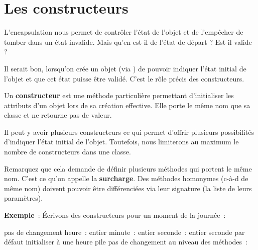 \section{Les constructeurs}

	L'encapsulation nous permet de contrôler
	l'état de l'objet et de
	l'empêcher de tomber dans un état invalide. Mais
	qu'en est-il de l'état de départ ?
	Est-il valide ?
	
	Il serait bon, lorsqu'on crée un objet (via
	) de pouvoir indiquer l'état
	initial de l'objet et que cet état puisse être validé.
	C'est le rôle précis des constructeurs.
	
	Un \textbf{constructeur} est une méthode particulière permettant
	d'initialiser les attributs d'un
	objet lors de sa création effective. Elle porte le même nom que sa
	classe et ne retourne pas de valeur.
	
	Il peut y avoir plusieurs constructeurs ce qui permet
	d'offrir plusieurs possibilités d'indiquer l'état initial de
	l'objet. Toutefois, nous limiterons au maximum le nombre 
	de constructeurs dans une classe.
	
	Remarquez que cela demande de définir plusieurs méthodes 
	qui portent le même nom. C'est ce qu'on appelle la
	\textbf{surcharge}. Des méthodes homonymes (c-à-d de même nom) doivent
	pouvoir être différenciées via leur signature (la liste de leurs
	paramètres).

	\textbf{Exemple}~:
	Écrivons des constructeurs pour un moment de la journée~:

	\begin{Pseudocode}
			\Private
				\LComment pas de changement
				\Decl heure~: entier
				\Decl minute~: entier
				\Decl seconde~: entier
			\Public
				 seconde par défaut
				\RComment initialiser à une heure pile
				\Empty
				\LComment pas de changement au niveau des méthodes~:
		\EndClass
		\end{Pseudocode}

